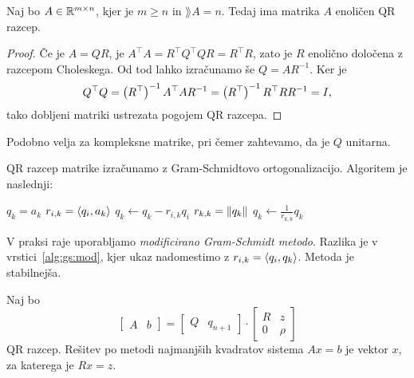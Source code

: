 \begin{izrek}
Naj bo $A \in \mathbb{R}^{m \times n}$, kjer je $m \geq n$ in
$\rang A = n$. Tedaj ima matrika $A$ enoličen QR razcep.
\end{izrek}

\begin{proof}
Če je $A = QR$, je $A^\top A = R^\top Q^\top Q R = R^\top R$, zato
je $R$ enolično določena z razcepom Choleskega. Od tod lahko
izračunamo še $Q = AR^{-1}$. Ker je
\[
Q^\top Q =
\left(R^\top\right)^{-1} A^\top A R^{-1} =
\left(R^\top\right)^{-1} R^\top R R^{-1} =
I,
\]
tako dobljeni matriki ustrezata pogojem QR razcepa.
\end{proof}

\begin{opomba}
Podobno velja za kompleksne matrike, pri čemer zahtevamo, da je
$Q$ unitarna.
\end{opomba}

\begin{opomba}
QR razcep matrike izračunamo z Gram-Schmidtovo ortogonalizacijo.
Algoritem je naslednji:

\begin{algorithmic}[1]
  \State $q_k = a_k$
    \State $r_{i,k} = \left\langle q_i, a_k\right\rangle$
    \label{alg:gs:mod}
    \State $q_k \gets q_k - r_{i,k} q_i$
  \EndFor
  \State $r_{k,k} = \left\lVert q_k\right\rVert$
  \State $q_k \gets \frac{1}{r_{k,k}} q_k$
\EndFor
\end{algorithmic}
\end{opomba}

\begin{opomba}
V praksi raje uporabljamo \emph{modificirano Gram-Schmidt metodo}.
Razlika je v vrstici~\ref{alg:gs:mod}, kjer ukaz nadomestimo z
$r_{i,k} = \left\langle q_i, q_k\right\rangle$. Metoda je stabilnejša.
\end{opomba}

\begin{trditev}
Naj bo
\[
\begin{bmatrix}
A & b
\end{bmatrix}
=
\begin{bmatrix}
Q & q_{n+1}
\end{bmatrix}
\cdot
\begin{bmatrix}
R &  z   \\
0 & \rho
\end{bmatrix}
\]
QR razcep. Rešitev po metodi najmanjših kvadratov sistema $Ax = b$
je vektor $x$, za katerega je $Rx = z$.
\end{trditev}

